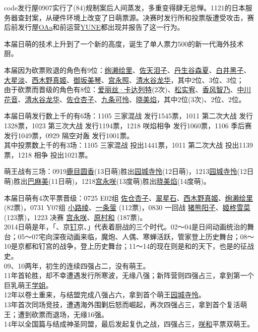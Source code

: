 code发行屋0907实行了(84)规制案后人间蒸发，多重变得肆无忌惮。1121的日本服务器查封案，从硬件环境上改变了日萌票源。决赛时发行所和投票版遭受攻击，赛后前发行屋\uline{OAa}和前运营\uline{YUNE}都出现并报告了这一行为。

本届日萌的技术上升到了一个新的高度，诞生了单人票力500的新一代海外技术厨。

本届因为砍票败退的角色有9位：\uline{绚濑绘里}、\uline{佐天泪子}、\uline{丹生谷森夏}、\uline{白井黑子}、\uline{大星淡}、\uline{西木野真姬}、\uline{御坂美琴}、\uline{宫永照}、\uline{清水谷龙华}，其中2位、3位、3位；\\
由于砍票而晋级的角色有8位：\uline{爱丽丝·卡达列特}(2次)、\uline{松实宥}、\uline{香风智乃}、\uline{中川花音}、\uline{清水谷龙华}、\uline{佐仓杏子}、\uline{九条可怜}、\uline{晓美焰}，其中2位(3次)、2位、2位。

本届日萌发行数上千的有6场：1105 三家混战 发行1545票，1011 第二次大战 发行1328票，1023 第三次大战 发行1194票，1218 咲焰相争 发行1060票，1106 季后赛 发行1049票，0929 隔空对轰 发行1001票。\\
其中投票数上千的有3场：1105 三家混战 投出1441票，1011 第二次大战 投出1139票，1218 相争 投出1021票。

萌王战有三场：0919\uline{鹿目圆香}(13日萌)胜出\uline{园城寺怜}(12日萌)，1213\uline{园城寺怜}(12日萌)胜出\uline{巴麻美}(11日萌)，1218\uline{宫永咲}(13度萌)胜出\uline{晓美焰}(14度萌)。

本届日萌有4次平票晋级：0725 E02组 \uline{佐仓杏子}、\uline{翠星石}、\uline{西木野真姬}、\uline{绚濑绘里} (82票)，0731 Y07组 \uline{小路绫}、\uline{一条萤} (112票)，0830 一回战 \uline{猪熊阳子}、\uline{姬柊雪菜} (123票)，1223 决赛 \uline{宫永咲}、\uline{原村和} (187票)。
\\

2014日萌是年，「、京\uline{钉}京、」代表着厨战的三个时代。02～04是日间动画统治的舞台；05～07宅向深夜动画来临，魔炮、人偶、寒蝉活跃，管家登上历史舞台；08～10是京都和钉宫的战争，登上历史舞台；11～14的现在则是和的天下，也是的征战史。\\
09、10两年，初生的连续四强占二，没有萌王。\\
11年首轮胜，却不幸遭遇发行所寒波，无缘八强；新阵营则四强占三，拿到第一个巨乳萌王\uline{学姐}。\\
12年以卷土重来，与结盟完成八强占六，拿到首个萌王\uline{园城寺怜}。\\
13年首次同场竞技，遭遇海外围剿后怒而崛起，再次四强占三，拿到首个复活萌王；遭到砍票而退场，无缘16强。\\
14年以全国篇与结成神圣同盟，最后发起复仇之战，四强占三，\uline{咲}\uline{和}平票双萌王。

